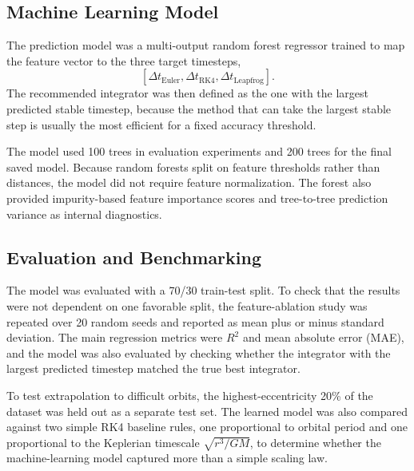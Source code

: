 \documentclass[12pt]{article}
\begin{document}
\subsection{Machine Learning Model}
The prediction model was a multi-output random forest regressor trained to map the feature vector to the three target timesteps,
\begin{equation}
    \left[\Delta t_{\mathrm{Euler}}, \Delta t_{\mathrm{RK4}}, \Delta t_{\mathrm{Leapfrog}}\right].
\end{equation}
The recommended integrator was then defined as the one with the largest predicted stable timestep, because the method that can take the largest stable step is usually the most efficient for a fixed accuracy threshold.

The model used 100 trees in evaluation experiments and 200 trees for the final saved model. Because random forests split on feature thresholds rather than distances, the model did not require feature normalization. The forest also provided impurity-based feature importance scores and tree-to-tree prediction variance as internal diagnostics.

\subsection{Evaluation and Benchmarking}
The model was evaluated with a 70/30 train-test split. To check that the results were not dependent on one favorable split, the feature-ablation study was repeated over 20 random seeds and reported as mean plus or minus standard deviation. The main regression metrics were $R^2$ and mean absolute error (MAE), and the model was also evaluated by checking whether the integrator with the largest predicted timestep matched the true best integrator.

To test extrapolation to difficult orbits, the highest-eccentricity 20\% of the dataset was held out as a separate test set. The learned model was also compared against two simple RK4 baseline rules, one proportional to orbital period and one proportional to the Keplerian timescale $\sqrt{r^3/GM}$, to determine whether the machine-learning model captured more than a simple scaling law.
\end{document}
